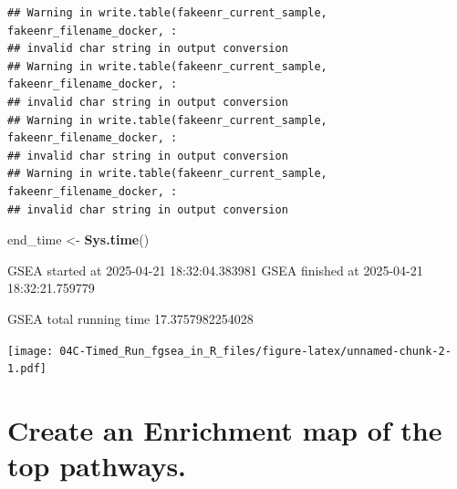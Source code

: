 \documentclass[
]{book}
\newenvironment{Shaded}{\begin{snugshade}}{\end{snugshade}}
\newcommand{\AttributeTok}[1]{\textcolor[rgb]{0.13,0.29,0.53}{#1}}
\newcommand{\DecValTok}[1]{\textcolor[rgb]{0.00,0.00,0.81}{#1}}
\newcommand{\FloatTok}[1]{\textcolor[rgb]{0.00,0.00,0.81}{#1}}
\newcommand{\FunctionTok}[1]{\textcolor[rgb]{0.13,0.29,0.53}{\textbf{#1}}}
\newcommand{\NormalTok}[1]{#1}
\newcommand{\OtherTok}[1]{\textcolor[rgb]{0.56,0.35,0.01}{#1}}
\newcommand{\SpecialCharTok}[1]{\textcolor[rgb]{0.81,0.36,0.00}{\textbf{#1}}}
\begin{document}
\begin{verbatim}
## Warning in write.table(fakeenr_current_sample, fakeenr_filename_docker, :
## invalid char string in output conversion
## Warning in write.table(fakeenr_current_sample, fakeenr_filename_docker, :
## invalid char string in output conversion
## Warning in write.table(fakeenr_current_sample, fakeenr_filename_docker, :
## invalid char string in output conversion
## Warning in write.table(fakeenr_current_sample, fakeenr_filename_docker, :
## invalid char string in output conversion
\end{verbatim}

\begin{Shaded}
\begin{Highlighting}[]
\NormalTok{end\_time }\OtherTok{\textless{}{-}} \FunctionTok{Sys.time}\NormalTok{()}
\end{Highlighting}
\end{Shaded}

GSEA started at 2025-04-21 18:32:04.383981
GSEA finished at 2025-04-21 18:32:21.759779

GSEA total running time 17.3757982254028

\begin{Shaded}
\end{Shaded}

\texttt{[image: 04C-Timed\_Run\_fgsea\_in\_R\_files/figure-latex/unnamed-chunk-2-1.pdf]}

\section{Create an Enrichment map of the top pathways.}\label{create-an-enrichment-map-of-the-top-pathways.-1}
\end{document}
